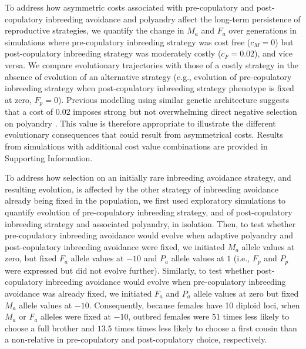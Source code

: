 \documentclass[10pt,letterpaper]{article}
\begin{document}
To address how asymmetric costs associated with pre-copulatory and post-copulatory inbreeding avoidance and polyandry affect the long-term persistence of reproductive strategies, we quantify the change in $M_{a}$ and $F_{a}$ over generations in simulations where pre-copulatory inbreeding strategy was cost free ($c_{M}=0$) but post-copulatory inbreeding strategy was moderately costly ($c_{F}=0.02$), and vice versa. We compare evolutionary trajectories with those of a costly strategy in the absence of evolution of an alternative strategy (e.g., evolution of pre-copulatory inbreeding strategy when post-copulatory inbreeding strategy phenotype is fixed at zero, $F_{p}=0$). Previous modelling using similar genetic architecture suggests that a cost of $0.02$ imposes strong but not overwhelming direct negative selection on polyandry \cite[][]{Duthie}. This value is therefore appropriate to illustrate the different evolutionary consequences that could result from asymmetrical costs. Results from simulations with additional cost value combinations are provided in Supporting Information.

To address how selection on an initially rare inbreeding avoidance strategy, and resulting evolution, is affected by the other strategy of inbreeding avoidance already being fixed in the population, we first used exploratory simulations to quantify evolution of pre-copulatory inbreeding strategy, and of post-copulatory inbreeding strategy and associated polyandry, in isolation. Then, to test whether pre-copulatory inbreeding avoidance would evolve when adaptive polyandry and post-copulatory inbreeding avoidance were fixed, we initiated $M_{a}$ allele values at zero, but fixed $F_{a}$ allele values at $-10$ and $P_{a}$ allele values at $1$ (i.e., $F_{p}$ and $P_{p}$ were expressed but did not evolve further). Similarly, to test whether post-copulatory inbreeding avoidance would evolve when pre-copulatory inbreeding avoidance was already fixed, we initiated $F_{a}$ and $P_{a}$ allele values at zero but fixed $M_{a}$ allele values at $-10$. Consequently, because females have 10 diploid loci, when $M_{a}$ or $F_{a}$ alleles were fixed at $-10$, outbred females were $51$ times less likely to choose a full brother and $13.5$ times times less likely to choose a first cousin than a non-relative in pre-copulatory and post-copulatory choice, respectively.
\end{document}

